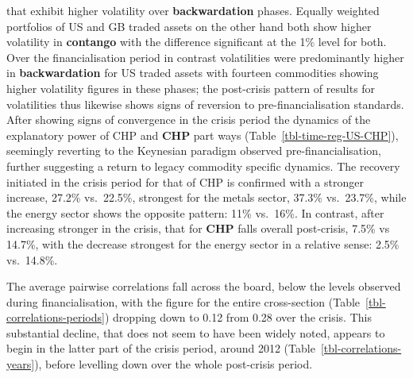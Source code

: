 \documentclass[
  authoryear,
  preprint,
  3p]{elsarticle}
\begin{document}
that exhibit higher volatility over \textbf{backwardation} phases.
Equally weighted portfolios of US and GB traded assets on the other hand
both show higher volatility in \textbf{contango} with the difference
significant at the 1\% level for both. Over the financialisation period
in contrast volatilities were predominantly higher in
\textbf{backwardation} for US traded assets with fourteen commodities
showing higher volatility figures in these phases; the post-crisis
pattern of results for volatilities thus likewise shows signs of
reversion to pre-financialisation standards. After showing signs of
convergence in the crisis period the dynamics of the explanatory power
of CHP and \textbf{CHP} part ways (Table~\ref{tbl-time-reg-US-CHP}),
seemingly reverting to the Keynesian paradigm observed
pre-financialisation, further suggesting a return to legacy commodity
specific dynamics. The recovery initiated in the crisis period for that
of CHP is confirmed with a stronger increase, 27.2\% vs.~22.5\%,
strongest for the metals sector, 37.3\% vs.~23.7\%, while the energy
sector shows the opposite pattern: 11\% vs.~16\%. In contrast, after
increasing stronger in the crisis, that for \textbf{CHP} falls overall
post-crisis, 7.5\% vs 14.7\%, with the decrease strongest for the energy
sector in a relative sense: 2.5\% vs.~14.8\%.

\medskip

The average pairwise correlations fall across the board, below the
levels observed during financialisation, with the figure for the entire
cross-section (Table~\ref{tbl-correlations-periods}) dropping down to
0.12 from 0.28 over the crisis. This substantial decline, that does not
seem to have been widely noted, appears to begin in the latter part of
the crisis period, around 2012 (Table~\ref{tbl-correlations-years}),
before levelling down over the whole post-crisis period.

\medskip
\end{document}
